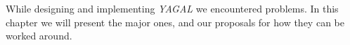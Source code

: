 While designing and implementing \textit{YAGAL} we encountered problems. In this chapter we will present the major ones, and our proposals for how they can be worked around.